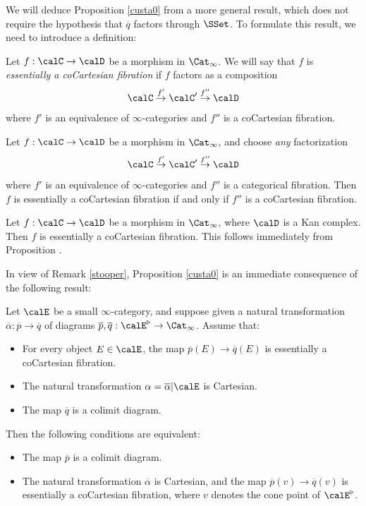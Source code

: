 We will deduce Proposition \ref{custa0} from a more general result, which does not require
the hypothesis that $\overline{q}$ factors through $\SSet$. To formulate this result, we need to introduce a definition:

\begin{definition}
Let $f: \calC \rightarrow \calD$ be a morphism in $\Cat_{\infty}$. We will say that $f$ is
{\it essentially a coCartesian fibration} if $f$ factors as a composition
$$ \calC \stackrel{f'}{\rightarrow} \calC' \stackrel{f''}{\rightarrow} \calD$$
where $f'$ is an equivalence of $\infty$-categories and $f''$ is a coCartesian fibration.
\end{definition}

\begin{remark}
Let $f: \calC \rightarrow \calD$ be a morphism in $\Cat_{\infty}$, and choose {\em any} factorization
$$ \calC \stackrel{f'}{\rightarrow} \calC' \stackrel{f''}{\rightarrow} \calD$$
where $f'$ is an equivalence of $\infty$-categories and $f''$ is a categorical fibration. Then
$f$ is essentially a coCartesian fibration if and only if $f''$ is a coCartesian fibration.
\end{remark}

\begin{remark}\label{stooper}
Let $f: \calC \rightarrow \calD$ be a morphism in $\Cat_{\infty}$, where $\calD$ is a Kan complex.
Then $f$ is essentially a coCartesian fibration. This follows immediately from Proposition .
\end{remark}

In view of Remark \ref{stooper}, Proposition \ref{custa0} is an immediate consequence of the following result:
\begin{proposition}\label{custa1}
Let $\calE$ be a small $\infty$-category, and suppose given a natural transformation
$\overline{\alpha}: \overline{p} \rightarrow \overline{q}$ of diagrams
$\overline{p}, \overline{q}: \calE^{\triangleright} \rightarrow \Cat_{\infty}$. Assume that:
\begin{itemize}
\item[$(a)$] For every object $E \in \calE$, the map $\overline{p}(E) \rightarrow \overline{q}(E)$
is essentially a coCartesian fibration. 
\item[$(b)$] The natural transformation $\alpha = \overline{\alpha} | \calE$ is Cartesian.
\item[$(c)$] The map $\overline{q}$ is a colimit diagram.
\end{itemize}
Then the following conditions are equivalent:
\begin{itemize}
\item[$(1)$] The map $\overline{p}$ is a colimit diagram.
\item[$(2)$] The natural transformation $\overline{\alpha}$ is Cartesian, and the map
$\overline{p}(v) \rightarrow \overline{q}(v)$ is essentially a coCartesian fibration, where
$v$ denotes the cone point of $\calE^{\triangleright}$.
\end{itemize}
\end{proposition} 


